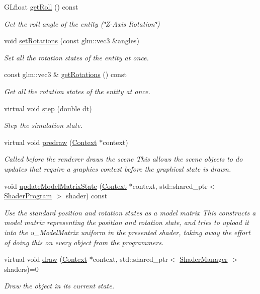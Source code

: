 \begin{DoxyCompactItemize}
G\+Lfloat \hyperlink{class_scene_object_a9c408db9660d645a86dd911abf96de11}{get\+Roll} () const 
\begin{DoxyCompactList}\small\item\em Get the roll angle of the entity (\char`\"{}\+Z-\/\+Axis Rotation\char`\"{}) \end{DoxyCompactList}\item 
void \hyperlink{class_scene_object_aece4f04fd597dd289c388b40fb9ed738}{set\+Rotations} (const glm\+::vec3 \&angles)
\begin{DoxyCompactList}\small\item\em Set all the rotation states of the entity at once. \end{DoxyCompactList}\item 
const glm\+::vec3 \& \hyperlink{class_scene_object_a1ff492a410e4338306462bae5f248ca1}{get\+Rotations} () const 
\begin{DoxyCompactList}\small\item\em Get all the rotation states of the entity at once. \end{DoxyCompactList}\item 
virtual void \hyperlink{class_scene_object_a5b69482cadd94997cd09bb145b1986d9}{step} (double dt)
\begin{DoxyCompactList}\small\item\em Step the simulation state. \end{DoxyCompactList}\item 
virtual void \hyperlink{class_scene_object_a2d5b85ae297772e2f5d0ef6fb920ddf2}{predraw} (\hyperlink{class_context}{Context} $\ast$context)
\begin{DoxyCompactList}\small\item\em Called before the renderer draws the scene This allows the scene objects to do updates that require a graphics context before the graphical state is drawn. \end{DoxyCompactList}\item 
void \hyperlink{class_scene_object_acbb90a879014f50ba44ad16e56436347}{update\+Model\+Matrix\+State} (\hyperlink{class_context}{Context} $\ast$context, std\+::shared\+\_\+ptr$<$ \hyperlink{class_shader_program}{Shader\+Program} $>$ shader) const 
\begin{DoxyCompactList}\small\item\em Use the standard position and rotation states as a model matrix This constructs a model matrix representing the position and rotation state, and tries to upload it into the u\+\_\+\+Model\+Matrix uniform in the presented shader, taking away the effort of doing this on every object from the programmers. \end{DoxyCompactList}\item 
virtual void \hyperlink{class_scene_object_a9dec6a34922a4063b561d3d16d396ee6}{draw} (\hyperlink{class_context}{Context} $\ast$context, std\+::shared\+\_\+ptr$<$ \hyperlink{class_shader_manager}{Shader\+Manager} $>$ shaders)=0
\begin{DoxyCompactList}\small\item\em Draw the object in its current state. \end{DoxyCompactList}\end{DoxyCompactItemize}
